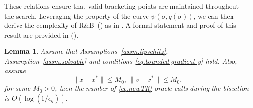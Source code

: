 \documentclass{article}
\newtheorem{lemma}[theorem]{Lemma}
\numberwithin{equation}{section}
\numberwithin{equation}{section}
\begin{document}
These relations ensure that valid bracketing points are maintained throughout the search. Leveraging the property of the curve $\psi(\sigma,y(\sigma))$, we can then derive the complexity of R\&B~() as in . A formal statement and proof of this result are provided in  ().
\begin{lemma}
    \label{lem.complexity bisection}
    Assume that Assumptions~\ref{assm.lipschitz}, Assumption~\ref{assm.solvable} and conditions \eqref{eq.bounded gradient y} hold. Also, assume \begin{equation}\label{eq.bounded assm point main text}
        \|x-x^*\|\leq M_0, \ \|v-x^*\|\leq M_0,
    \end{equation}
    for some $M_0>0$, then the number of \ref{eq.newTR} oracle calls during the bisection is $O\left(\log \left(1/\epsilon_g\right)\right)$.
\end{lemma}
\end{document}
